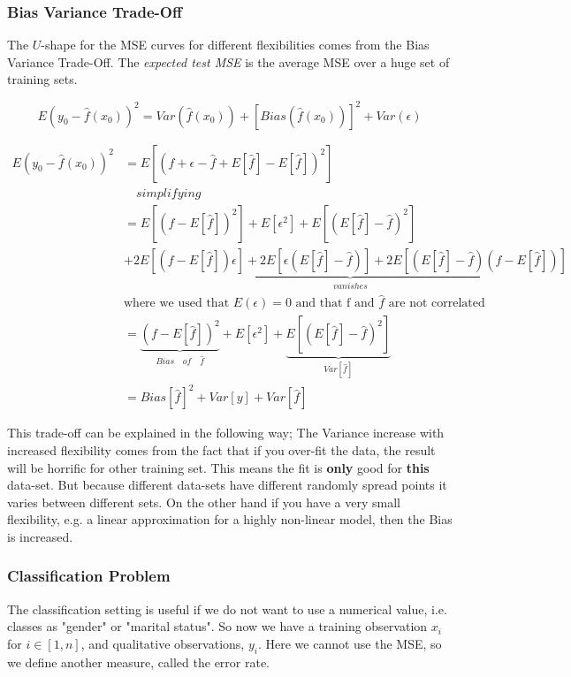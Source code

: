 \documentclass{article}
\begin{document}
\subsubsection{Bias Variance Trade-Off}
The $U$-shape for the MSE curves for different flexibilities comes from the Bias Variance Trade-Off. The \textit{expected test MSE} is the average MSE over a huge set of training sets.

\begin{equation}
{E(y_0-\hat{f}(x_0))^2 = Var(\hat{f}(x_0)) + [Bias(\hat{f}(x_0))]^2 + Var(\epsilon)}
\end{equation}

\begin{align*}
E(y_0-\hat{f}(x_0))^2 &= E[(f+\epsilon - \hat{f} + E[\hat{f}] - E[\hat{f}])^2] \\
&\quad simplifying \\
&= E[(f-E[\hat{f}])^2] + E[\epsilon ^2] +E[(E[\hat{f}]-\hat{f})^2]\\
&+ \underbrace{ 2 E[(f-E[\hat{f}])\epsilon] + 2E[\epsilon( E[\hat{f}]-\hat{f})] + 2E[(E[\hat{f}]-\hat{f})(f-E[\hat{f}])]}_{vanishes} \\
&\text{where we used that $E(\epsilon)=0$ and that f and $\hat{f}$ are not correlated}\\
&= \underbrace{ (f - E[\hat{f}])^2 }_{Bias\quad of \quad \hat{f}} + E[\epsilon ^2] + \underbrace{ E[(E[\hat{f}]-\hat{f})^2]}_{Var[\hat{f}]} \\
& = Bias[\hat{f}]^2 + Var[y] + Var[\hat{f}] 
\end{align*}


This trade-off can be explained in the following way;
The Variance increase with increased flexibility comes from the fact that if you over-fit the data, the result will be horrific for other training set. This means the fit is \textbf{only} good for \textbf{this} data-set. But because different data-sets have different randomly spread points it varies between different sets.
On the other hand if you have a very small flexibility, e.g. a linear approximation for a highly non-linear model, then the Bias is increased.

\subsubsection{Classification Problem }

The classification setting is useful if we do not want to use a numerical value, i.e. classes as "gender" or "marital status". So now we have a training observation $x_i$ for $i\in [1,n]$, and qualitative observations, $y_i$. Here we cannot use the MSE, so we define another measure, called the error rate. 
\end{document}
